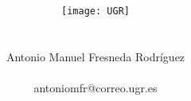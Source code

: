 \documentclass[10pt,spanish]{article}
\author{
	\\\\
	\texttt{[image: UGR]} \\\\\\
	\Large 	Antonio Manuel Fresneda Rodríguez\\
	\\antoniomfr@correo.ugr.es
	}
\date{}
\title{\huge \textbf{}}
\begin{document}
	\maketitle
	\pagebreak
	\tableofcontents
	\pagebreak
\end{document}
